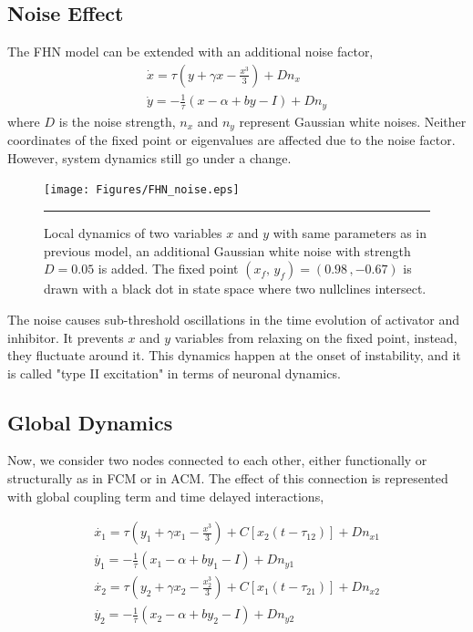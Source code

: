 \subsection{Noise Effect}

The FHN model can be extended with an additional noise factor, 
\begin{subequations}
\begin{align}\dot{x} = \tau (y + \gamma x - \frac{x^3}{3}) + Dn_x  \label{eqn: frobenius 12}\\  \dot{y} = -\frac{1}{\tau} (x - \alpha + b y - I ) + Dn_y \label{eqn: frobenius 13}   \end{align} 
\end{subequations}
where $D$ is the noise strength, $n_x$ and $n_y$ represent Gaussian white noises. Neither coordinates of the fixed point or eigenvalues are affected due to the noise factor. However, system dynamics still go under a change. 

\begin{figure}[htbp]
  \centering
	\texttt{[image: Figures/FHN\_noise.eps]}
 
    \rule{35em}{0.5pt}
    \caption[FHN Noise]{Local dynamics of two variables $x$ and  $y$ with same parameters as in previous model, an additional Gaussian white noise with strength $D=0.05$ is added. The fixed point $(x_f, \, y_f) = (0.98 \, , -0.67 )$ is drawn with a black dot in state space where two nullclines intersect.   }
  \label{fig:FHN Noise}	
\end{figure}

The noise causes sub-threshold oscillations in the time evolution of activator and inhibitor. It prevents $x$ and $y$ variables from relaxing on the fixed point, instead, they fluctuate around it. This dynamics happen at the onset of instability, and it is called "type II excitation" in terms of neuronal dynamics.


\subsection{Global Dynamics}

Now, we consider two nodes connected to each other, either functionally or structurally as in FCM or in ACM. The effect of this connection is represented with global coupling term and time delayed interactions, 

\begin{subequations}
 \begin{align}\dot{x_1} = \tau (y_1 + \gamma x_1 - \frac{x^3}{3}) + C [x_2(t-\tau_{12})] +Dn_{x1} \label{eqn: frobenius 14}\\  \dot{y_1} = -\frac{1}{\tau} (x_1 - \alpha + b y_1 - I )+ Dn_{y1} \label{eqn: frobenius 15} \\ \dot{x_2} = \tau (y_2 + \gamma x_2 - \frac{x_2^3}{3}) + C [x_1(t-\tau_{21})] + Dn_{x2} \label{eqn: frobenius 16} \\  \dot{y_2} = -\frac{1}{\tau} (x_2 - \alpha + b y_2 - I ) + Dn_{y2}\end{align} 
\end{subequations}
 
